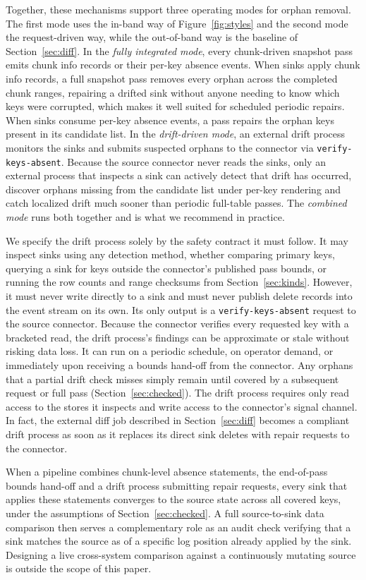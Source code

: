 \documentclass[sigconf,nonacm,10pt]{acmart}
\begin{document}
Together, these mechanisms support three operating modes for orphan removal.
The first mode uses the in-band way of Figure~\ref{fig:styles} and the second
mode the request-driven way, while the out-of-band way is the baseline of
Section~\ref{sec:diff}. In the \emph{fully integrated mode}, every chunk-driven
snapshot pass emits chunk info records or their per-key absence events. When
sinks apply chunk info records, a full snapshot pass removes every orphan across
the completed chunk ranges, repairing a drifted sink without anyone needing to
know which keys were corrupted, which makes it well suited for scheduled
periodic repairs. When sinks consume per-key absence events, a pass repairs the
orphan keys present in its candidate list. In the \emph{drift-driven mode}, an
external drift process monitors the sinks and submits suspected orphans to the
connector via \texttt{verify-keys-absent}. Because the source connector never
reads the sinks, only an external process that inspects a sink can actively
detect that drift has occurred, discover orphans missing from the candidate
list under per-key rendering and catch localized drift much sooner than
periodic full-table passes. The \emph{combined mode} runs both together and is
what we recommend in practice.

We specify the drift process solely by the safety contract it must follow. It
may inspect sinks using any detection method, whether comparing primary keys,
querying a sink for keys outside the connector's published pass bounds, or
running the row counts and range checksums from Section~\ref{sec:kinds}.
However, it must never write directly to a sink and must never publish delete
records into the event stream on its own. Its only output is a
\texttt{verify-keys-absent} request to the source connector. 
Because the connector verifies every
requested key with a bracketed read, the drift process's findings can be
approximate or stale without risking data loss. It can run on a periodic
schedule, on operator demand, or immediately upon receiving a bounds hand-off
from the connector. Any orphans that a partial drift check misses simply remain
until covered by a subsequent request or full pass
(Section~\ref{sec:checked}). The drift process requires only read access to the stores it inspects and
write access to the connector's signal channel. In fact, the external
diff job described in Section~\ref{sec:diff} becomes a compliant drift process
as soon as it replaces its direct sink deletes with repair requests to the
connector.

When a pipeline combines chunk-level absence statements, the end-of-pass bounds
hand-off and a drift process submitting repair requests, every sink that
applies these statements converges to the source state across all covered keys,
under the assumptions of Section~\ref{sec:checked}. A full source-to-sink data
comparison then serves a complementary role as an audit check verifying that a
sink matches the source as of a specific log position already applied by the
sink. Designing a live cross-system comparison against a continuously mutating
source is outside the scope of this paper.
\end{document}
